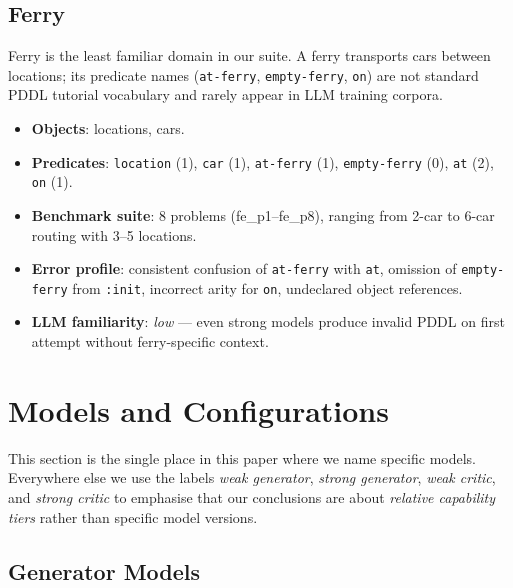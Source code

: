 \documentclass{article}
\begin{document}
\subsection{Ferry}
\label{sec:ferry}

Ferry is the least familiar domain in our suite.  A ferry transports cars between
locations; its predicate names (\texttt{at-ferry}, \texttt{empty-ferry}, \texttt{on})
are not standard PDDL tutorial vocabulary and rarely appear in LLM training corpora.

\begin{itemize}[leftmargin=1.5em]
  \item \textbf{Objects}: locations, cars.
  \item \textbf{Predicates}: \texttt{location} (1), \texttt{car} (1), \texttt{at-ferry} (1),
        \texttt{empty-ferry} (0), \texttt{at} (2), \texttt{on} (1).
  \item \textbf{Benchmark suite}: 8 problems (fe\_p1--fe\_p8), ranging from 2-car to
        6-car routing with 3--5 locations.
  \item \textbf{Error profile}: consistent confusion of \texttt{at-ferry} with \texttt{at},
        omission of \texttt{empty-ferry} from \texttt{:init}, incorrect arity for
        \texttt{on}, undeclared object references.
  \item \textbf{LLM familiarity}: \emph{low} --- even strong models produce invalid
        PDDL on first attempt without ferry-specific context.
\end{itemize}

\section{Models and Configurations}
\label{sec:models}

This section is the single place in this paper where we name specific models.
Everywhere else we use the labels \emph{weak generator}, \emph{strong generator},
\emph{weak critic}, and \emph{strong critic} to emphasise that our conclusions are
about \emph{relative capability tiers} rather than specific model versions.

\subsection{Generator Models}
\label{sec:gen_models}
\end{document}
